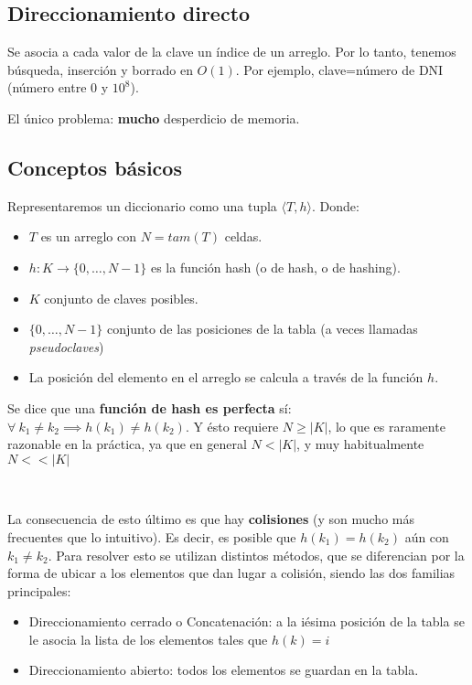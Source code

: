 \subsection{Direccionamiento directo}
Se asocia a cada valor de la clave un \'indice de un arreglo. Por lo tanto, tenemos b\'usqueda, inserci\'on y borrado en $O(1)$. Por ejemplo, clave=n\'umero de DNI (n\'umero entre 0 y $10^8$).

El \'unico problema: \textbf{mucho} desperdicio de memoria.

\subsection{Conceptos b\'asicos}
Representaremos un diccionario como una tupla $\langle T,h \rangle$. Donde:
\begin{itemize}
 \item $T$ es un arreglo con $N=tam(T)$ celdas.
 \item $h: K \rightarrow\{0,\dots,N-1\}$ es la funci\'on hash (o de hash, o de hashing).
 \item $K$ conjunto de claves posibles.
 \item $\{0,\dots,N-1\}$ conjunto de las posiciones de la tabla (a veces llamadas \textit{pseudoclaves})
 \item La posici\'on del elemento en el arreglo se calcula a trav\'es de la funci\'on $h$.
\end{itemize}


Se dice que una \textbf{funci\'on de hash es perfecta} s\'i: $\forall\ k_1 \neq k_2 \implies h(k_1) \neq h(k_2)$. Y \'esto requiere $N \geq |K|$, lo que es raramente razonable en la pr\'actica, ya que en general $N < |K|$, y muy habitualmente $N < < |K|$

~

La consecuencia de esto \'ultimo es que hay \textbf{colisiones} (y son mucho m\'as frecuentes que lo intuitivo). Es decir, es posible que $h(k_1) = h(k_2)$ a\'un con $k_1 \neq k_2 $. Para resolver esto se utilizan distintos m\'etodos, que se diferencian por la forma de ubicar a los elementos que dan lugar a colisi\'on, siendo las dos familias principales:
\begin{itemize}
 \item Direccionamiento cerrado o Concatenaci\'on: a la i\-\'esima posici\'on de la tabla se le asocia la lista de los elementos tales que $h(k)=i$
 \item Direccionamiento abierto: todos los elementos se guardan en la tabla.
\end{itemize}

